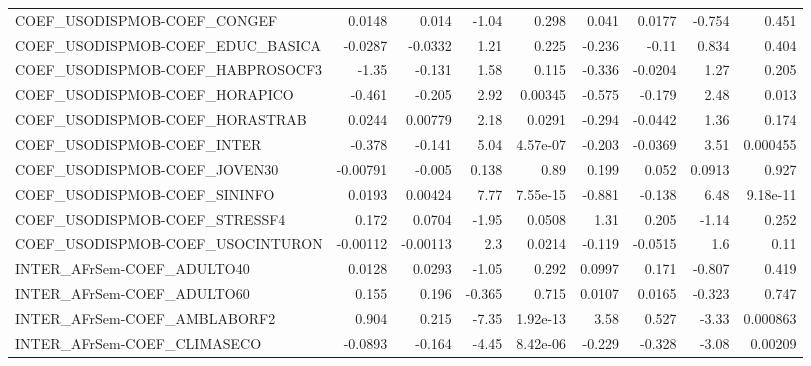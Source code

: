 \begin{tabular}{lrrrrrrrr}
COEF\_USODISPMOB-COEF\_CONGEF            &      0.0148 &        0.014 &   -1.04 &    0.298 &      0.041 &      0.0177 &       -0.754 &         0.451 \\
COEF\_USODISPMOB-COEF\_EDUC\_BASICA       &     -0.0287 &      -0.0332 &    1.21 &    0.225 &     -0.236 &       -0.11 &        0.834 &         0.404 \\
COEF\_USODISPMOB-COEF\_HABPROSOCF3       &       -1.35 &       -0.131 &    1.58 &    0.115 &     -0.336 &     -0.0204 &         1.27 &         0.205 \\
COEF\_USODISPMOB-COEF\_HORAPICO          &      -0.461 &       -0.205 &    2.92 &  0.00345 &     -0.575 &      -0.179 &         2.48 &         0.013 \\
COEF\_USODISPMOB-COEF\_HORASTRAB         &      0.0244 &      0.00779 &    2.18 &   0.0291 &     -0.294 &     -0.0442 &         1.36 &         0.174 \\
COEF\_USODISPMOB-COEF\_INTER             &      -0.378 &       -0.141 &    5.04 & 4.57e-07 &     -0.203 &     -0.0369 &         3.51 &      0.000455 \\
COEF\_USODISPMOB-COEF\_JOVEN30           &    -0.00791 &       -0.005 &   0.138 &     0.89 &      0.199 &       0.052 &       0.0913 &         0.927 \\
COEF\_USODISPMOB-COEF\_SININFO           &      0.0193 &      0.00424 &    7.77 & 7.55e-15 &     -0.881 &      -0.138 &         6.48 &      9.18e-11 \\
COEF\_USODISPMOB-COEF\_STRESSF4          &       0.172 &       0.0704 &   -1.95 &   0.0508 &       1.31 &       0.205 &        -1.14 &         0.252 \\
COEF\_USODISPMOB-COEF\_USOCINTURON       &    -0.00112 &     -0.00113 &     2.3 &   0.0214 &     -0.119 &     -0.0515 &          1.6 &          0.11 \\
INTER\_AFrSem-COEF\_ADULTO40             &      0.0128 &       0.0293 &   -1.05 &    0.292 &     0.0997 &       0.171 &       -0.807 &         0.419 \\
INTER\_AFrSem-COEF\_ADULTO60             &       0.155 &        0.196 &  -0.365 &    0.715 &     0.0107 &      0.0165 &       -0.323 &         0.747 \\
INTER\_AFrSem-COEF\_AMBLABORF2           &       0.904 &        0.215 &   -7.35 & 1.92e-13 &       3.58 &       0.527 &        -3.33 &      0.000863 \\
INTER\_AFrSem-COEF\_CLIMASECO            &     -0.0893 &       -0.164 &   -4.45 & 8.42e-06 &     -0.229 &      -0.328 &        -3.08 &       0.00209 \\

\end{tabular}
